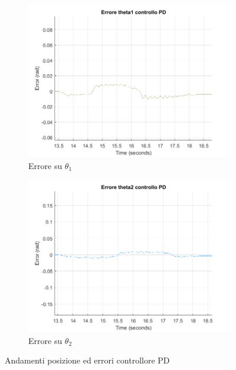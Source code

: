 \begin{figure}[!ht]
\begin{subfigure}{.5\textwidth}
  \label{fig:sub-pd2p}
\end{subfigure}
\begin{subfigure}{.5\textwidth}
  \centering
  \includegraphics[width=1\linewidth]{Immagini/Traiettorie/ErroreTheta1PD}  
  \caption{Errore su $\theta_1$}
  \label{fig:sub-pd3p}
\end{subfigure}
\begin{subfigure}{.5\textwidth}
  \centering
  \includegraphics[width=1\linewidth]{Immagini/Traiettorie/ErroreTheta2PD}  
  \caption{Errore su $\theta_2$}
  \label{fig:sub-pd4p}
\end{subfigure}
\caption{Andamenti posizione ed errori controllore PD}
\label{fig:AndamentiPD}
\end{figure}
